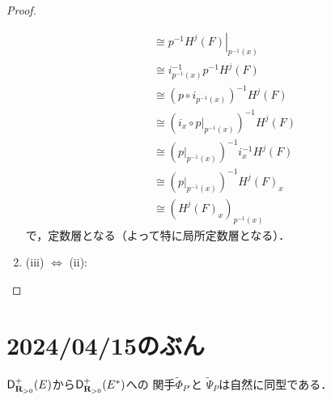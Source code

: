 \begin{proof}
\begin{enumerate}
\begin{align*}
            &\cong
            p^{-1}\left. H^j\left(F\right)\right\rvert_{p^{-1}(x)}\\
            &\cong
            i^{-1}_{p^{-1}(x)}p^{-1}H^j\left(F\right)\\
            &\cong
            \left(p\circ i_{p^{-1}(x)}\right)^{-1}H^j\left(F\right)\\
            &\cong
            \left(i_{x}\circ p\rvert_{p^{-1}(x)}\right)^{-1}H^j\left(F\right)\\
            &\cong
            \left(p\rvert_{p^{-1}(x)}\right)^{-1}i_{x}^{-1}H^j\left(F\right)\\
            &\cong
            \left(p\rvert_{p^{-1}(x)}\right)^{-1}H^j\left(F\right)_{x}\\
            &\cong
            \left(H^j\left(F\right)_{x}\right)_{p^{-1}(x)}
        \end{align*}
        で，定数層となる（よって特に局所定数層となる）．
        \item\label{372-32} (iii) \(\Leftrightarrow\) (ii):      
    \end{enumerate}
\end{proof}


\clearpage

\section{2024/04/15のぶん}

\begin{THM}[{\cite[Theorem 3.7.7]{KS90}}]
    \(\mathop{\mathsf{D}^{+}_{\mathbf{R}_{>0}}}\nolimits(E)\)から\(\mathop{\mathsf{D}^{+}_{\mathbf{R}_{>0}}}\nolimits(E^\ast)\)への
    関手\(\widetilde{\varPhi}_{P'}\)と
    \(\widetilde{\varPsi}_{P}\)は自然に同型である．
\end{THM}

